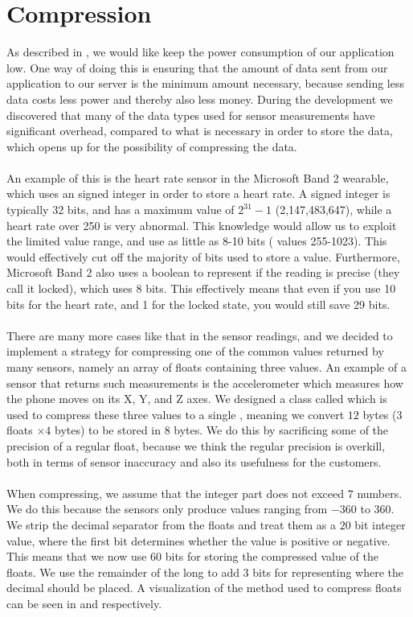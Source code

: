 
\section{Compression}
\label{sec:compression}

As described in , we would like keep the power consumption of our application low. One way of doing this is ensuring that the amount of data sent from our application to our server is the minimum amount necessary, because sending less data costs less power and thereby also less money. During the development we discovered that many of the data types used for sensor measurements have significant overhead, compared to what is necessary in order to store the data, which opens up for the possibility of compressing the data. 
\\\\
An example of this is the heart rate sensor in the Microsoft Band 2 wearable, which uses an signed integer in order to store a heart rate. A signed integer is typically 32 bits, and has a maximum value of $2^{31} - 1$ (2,147,483,647), while a heart rate over 250 is very abnormal. This knowledge would allow us to exploit the limited value range, and use as little as 8-10 bits ( values 255-1023). This would effectively cut off the majority of bits used to store a value. Furthermore, Microsoft Band 2 also uses a boolean to represent if the reading is precise (they call it locked), which uses 8 bits. This effectively means that even if you use 10 bits for the heart rate, and 1 for the locked state, you would still save 29 bits.    
\\\\
There are many more cases like that in the sensor readings, and we decided to implement a strategy for compressing one of the common values returned by many sensors, namely an array of floats containing three values. An example of a sensor that returns such measurements is the accelerometer which measures how the phone moves on its X, Y, and Z axes. We designed a class called  which is used to compress these three values to a single , meaning we convert $12$ bytes ($3$ floats $\times 4$ bytes) to be stored in $8$ bytes. We do this by sacrificing some of the precision of a regular float, because we think the regular precision is overkill, both in terms of sensor inaccuracy and also its usefulness for the customers. 
\\\\
When compressing, we assume that the integer part does not exceed $7$ numbers. We do this because the sensors only produce values ranging from $-360$ to $360$. We strip the decimal separator from the floats and treat them as a $20$ bit integer value, where the first bit determines whether the value is positive or negative. This means that we now use $60$ bits for storing the compressed value of the floats. We use the remainder of the long to add 3 bits for representing where the decimal should be placed. A visualization of the method used to compress floats can be seen in  and  respectively.

